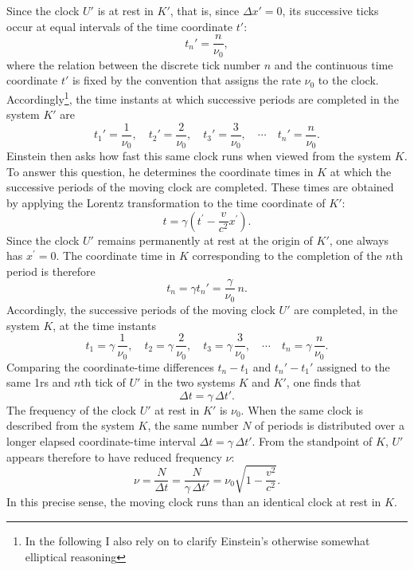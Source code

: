 \documentclass[pdflatex,sn-basic]{sn-jnl}
\begin{document}
Since the clock $U'$ is at rest in $K'$, that is, since $\Delta x'=0$, its successive ticks occur at equal intervals of the time coordinate $t'$:
%
\begin{equation*}
t_n'=\frac{n}{\nu_0},
\end{equation*}
%
where the relation between the discrete tick number $n$ and the continuous time coordinate $t'$ is fixed by the convention that assigns the rate $\nu_0$ to the clock. Accordingly\footnote{In the following I also rely on \citep[131-32]{Einstein1910} to clarify Einstein’s otherwise somewhat elliptical reasoning}, the time instants at which successive periods are completed in the system $K'$ are
%
\begin{equation*}
t_1'=\frac{1}{\nu_0}, \quad
t_2'=\frac{2}{\nu_0}, \quad
t_3'=\frac{3}{\nu_0}, \quad \cdots \quad
t_n'=\frac{n}{\nu_0}.
\end{equation*}
%
Einstein then asks how fast this same clock runs when viewed from the system $K$. To answer this question, he determines the coordinate times in $K$ at which the successive periods of the moving clock are completed. These times are obtained by applying the Lorentz transformation to the time coordinate of $K'$:
%
\begin{equation*}
t=\gamma \left(t^{\prime}-\frac{v}{c^2} x^{\prime}\right).
\end{equation*}
%
Since the clock $U'$ remains permanently at rest at the origin of $K'$, one always has $x^{\prime}=0$. The coordinate time in $K$ corresponding to the completion of the $n$th period is therefore
%
\begin{equation*}
t_n=\gamma t_n'=\frac{\gamma}{\nu_0}\,n.
\end{equation*}
%
Accordingly, the successive periods of the moving clock $U'$ are completed, in the system $K$, at the time instants
%
\begin{equation*}
t_1=\gamma\,\frac{1}{\nu_0}, \quad
t_2=\gamma\,\frac{2}{\nu_0}, \quad
t_3=\gamma\,\frac{3}{\nu_0}, \quad \cdots \quad
t_n=\gamma\,\frac{n}{\nu_0}.
\end{equation*}
%
Comparing the coordinate-time differences $t_n-t_1$ and $t_n'-t_1'$ assigned to the same 1rs and $n$th tick of $U'$ in the two systems $K$ and $K'$, one finds that
%
\begin{equation*}
\Delta t=\gamma\,\Delta t'.
\end{equation*}
%
The frequency of the clock $U'$ at rest in $K'$ is $\nu_0$. When the same clock is described from the system $K$, the same number $N$ of periods is distributed over a longer elapsed coordinate-time interval $\Delta t=\gamma\,\Delta t'$. From the standpoint of $K$,  $U'$ appears therefore to have reduced frequency $\nu$:
%
\begin{equation}\label{eq:frequency}
\nu = \frac{N}{\Delta t} = \frac{N}{\gamma\,\Delta t'} = \nu_0 \sqrt{1-\frac{v^2}{c^2}}.
\end{equation}
%
In this precise sense, the moving clock runs  than an identical clock at rest in $K$.
\end{document}
